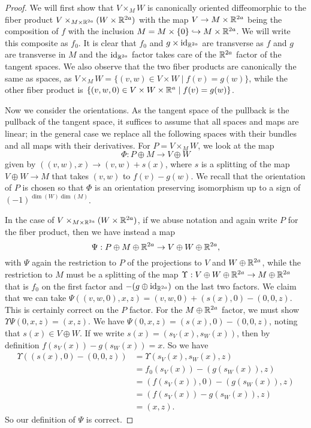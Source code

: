 \begin{proof}
	We will first show that $V \times_M W$ is canonically oriented diffeomorphic to the fiber product $V\times_{M \times \mathbb{R}^{2a}} (W \times \mathbb{R}^{2a})$ with the map $V \to M \times \mathbb{R}^{2a}$ being the composition of $f$ with the inclusion $M = M \times \{0\} \hookrightarrow M \times \mathbb{R}^{2a}$.
	We will write this composite as $f_0$.
	It is clear that $f_0$ and $g \times \mathrm{id}_{\mathbb{R}^{2a}}$ are transverse as $f$ and $g$ are transverse in $M$ and the $\mathrm{id}_{\mathbb{R}^{2a}}$ factor takes care of the $\mathbb{R}^{2a}$ factor of the tangent spaces.
	We also observe that the two fiber products are canonically the same as spaces, as $V \times_M W = \{(v,w) \in V \times W \mid f(v) = g(w)\}$, while the other fiber product is $\{(v,w,0) \in V \times W \times \mathbb{R}^a \mid f(v) = g(w)\}$.

	Now we consider the orientations.
	As the tangent space of the pullback is the pullback of the tangent space, it suffices to assume that all spaces and maps are linear; in the general case we replace all the following spaces with their bundles and all maps with their derivatives.
	For $P = V \times_M W$, we look at the map
	\begin{equation}\label{E: fiber orient}
		\Phi \colon P \oplus M \to V \oplus W
	\end{equation}
	given by $((v,w),x) \to (v,w)+s(x)$, where $s$ is a splitting of the map $V \oplus W \to M$ that takes $(v,w)$ to $f(v)-g(w)$.
	We recall that the orientation of $P$ is chosen so that $\Phi$ is an orientation preserving isomorphism up to a sign of $(-1)^{\dim(W)\dim(M)}$.

	In the case of $V\times_{M \times \mathbb{R}^{2a}} (W \times \mathbb{R}^{2a})$, if we abuse notation and again write $P$ for the fiber product, then we have instead a map
	\begin{equation}\label{E: fiber plus euclidean}
		\Psi: P \oplus M \oplus \mathbb{R}^{2a} \to V \oplus W \oplus \mathbb{R}^{2a},
	\end{equation}
	with $\Psi$ again the restriction to $P$ of the projections to $V$ and $W \oplus \mathbb{R}^{2a}$, while the restriction to $M$ must be a splitting of the map $\Upsilon: V \oplus W \oplus \mathbb{R}^{2a} \to M \oplus \mathbb{R}^{2a}$ that is $f_0$ on the first factor and $-(g \oplus \mathrm{id}_{\mathbb{R}^{2a}})$ on the last two factors.
	We claim that we can take $\Psi((v,w,0),x,z) = (v,w,0)+(s(x),0)-(0,0,z)$.
	This is certainly correct on the $P$ factor.
	For the $M \oplus \mathbb{R}^{2a}$ factor, we must show $\Upsilon \Psi(0,x,z) = (x,z)$.
	We have $\Psi(0,x,z) = (s(x),0)-(0,0,z)$, noting that $s(x) \in V \oplus W$.
	If we write $s(x) = (s_V(x),s_W(x))$, then by definition $f(s_V(x))-g(s_W(x)) = x$.
	So we have
	\begin{align*}
		\Upsilon((s(x),0)-(0,0,z))& =
		\Upsilon(s_V(x),s_W(x),z)\\& =
		f_0(s_V(x))-(g(s_W(x)),z)\\& =
		(f(s_V(x)),0)-(g(s_W(x)),z)\\& =
		(f(s_V(x))-g(s_W(x)),z)\\& =
		(x,z).
	\end{align*}
	So our definition of $\Psi$ is correct.


\end{proof}
